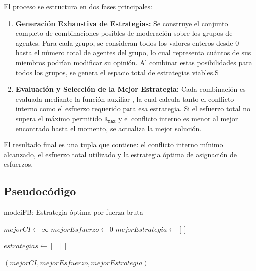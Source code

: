 \documentclass[11pt,letter]{article}
\begin{document}
El proceso se estructura en dos fases principales:

\begin{enumerate}
    \item \textbf{Generación Exhaustiva de Estrategias:} Se construye el conjunto completo de combinaciones posibles de moderación sobre los grupos de agentes. Para cada grupo, se consideran todos los valores enteros desde 0 hasta el número total de agentes del grupo, lo cual representa cuántos de sus miembros podrían modificar su opinión. Al combinar estas posibilidades para todos los grupos, se genera el espacio total de estrategias viables.S
    \item \textbf{Evaluación y Selección de la Mejor Estrategia:} Cada combinación es evaluada mediante la función auxiliar , la cual calcula tanto el conflicto interno como el esfuerzo requerido para esa estrategia. Si el esfuerzo total no supera el máximo permitido $\mathtt{R_{\text{max}}}$ y el conflicto interno es menor al mejor encontrado hasta el momento, se actualiza la mejor solución.
\end{enumerate}

El resultado final es una tupla que contiene: el conflicto interno mínimo alcanzado, el esfuerzo total utilizado y la estrategia óptima de asignación de esfuerzos.

\subsection{Pseudocódigo}
\begin{algorithm}[H]
\caption{modciFB: Estrategia óptima por fuerza bruta}

$mejorCI \leftarrow \infty$ 
$mejorEsfuerzo \leftarrow 0$ 
$mejorEstrategia \leftarrow []$ 

$estrategias \leftarrow [[]]$ 



\Return $(mejorCI, mejorEsfuerzo, mejorEstrategia)$
\end{algorithm}
\end{document}
